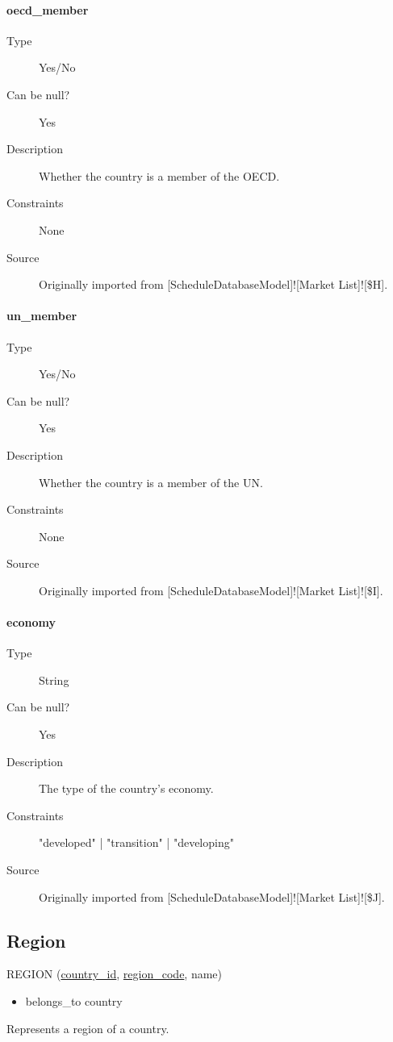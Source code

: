 \documentclass[]{report}
\begin{document}
\paragraph{oecd\_member}
	\begin{description}
	\item[Type]Yes/No
	\item[Can be null?]Yes
	\item[Description]Whether the country is a member of the OECD. 
	\item[Constraints]None
	\item[Source]Originally imported from [ScheduleDatabaseModel]![Market List]![\$H].
	\end{description}
\paragraph{un\_member}
	\begin{description}
	\item[Type]Yes/No
	\item[Can be null?]Yes
	\item[Description]Whether the country is a member of the UN. 
	\item[Constraints]None
	\item[Source]Originally imported from [ScheduleDatabaseModel]![Market List]![\$I].
	\end{description}
\paragraph{economy}
	\begin{description}
	\item[Type]String
	\item[Can be null?]Yes
	\item[Description]The type of the country's economy. 
	\item[Constraints]"developed" | "transition" | "developing"
	\item[Source]Originally imported from [ScheduleDatabaseModel]![Market List]![\$J].
	\end{description}
\subsection{Region}
REGION (\underline{country\_id}, \underline{region\_code}, name)
\begin{itemize}
\item belongs\_to country
\end{itemize}
Represents a region of a country.
\end{document}
